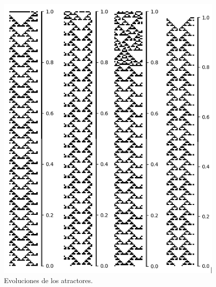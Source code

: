 \documentclass[11pt]{article}
\begin{document}
			\begin{figure}[H]
			\centering
			\includegraphics[scale=0.3]{resources/Atractores22/atractor_22_size_22_res.png}
			\caption{Evoluciones de los atractores.}\label{fig:picture}
			\end{figure}
\end{document}
